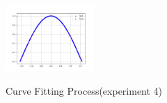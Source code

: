 \documentclass[12pt]{article}
\theoremstyle{remark}
\begin{document}
\begin{figure}[h]
{													\includegraphics[width=0.3\textwidth]{../width=100loss=mean_absolute_errorini=0.1rep=4/predict_plot_2500.png}}
												\caption{Curve Fitting Process(experiment 4)}
											\end{figure}
											\newpage
							
							
\end{document}
